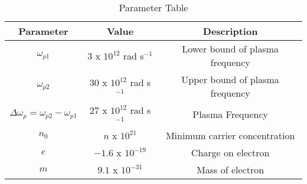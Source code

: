 \begin{table}[ht]
  \centering
    \begin{tabular}{|c|c|c|}
        \hline
	   \textbf{ Parameter} & \textbf{Value} & \textbf{Description} \\
	       \hline
	           $\omega_{p1}$ & $3$ x $10^{12}$ rad s$^{-1}$ & Lower bound of plasma frequency \\
		       \hline
		            $\omega_{p2}$ & $30$ x $10^{12}$ rad s$^{-1}$ & Upper bound of plasma frequency \\
			        \hline
				    $\Delta\omega_p = \omega_{p2} - \omega_{p1}$  & $27$ x $10^{12}$ rad s$^{-1}$ & Plasma Frequency  \\
				        \hline
					    $n_0$ &  $n$ x $10^{21}$ &  Minimum carrier concentration \\
					        \hline
						    $e$ &  $-1.6$ x $10^{-19}$ & Charge on electron \\
						        \hline
							    $m$ & $9.1$ x $10^{-31}$ & Mass of electron \\
							        \hline
								  \end{tabular}
								    \vspace{2mm}
								      \caption{Parameter Table}
								        \label{tab:11.9.3.31}
									\end{table}
